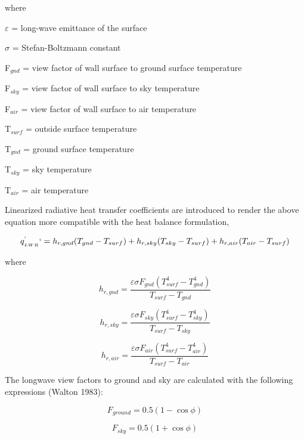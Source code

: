 where

$\varepsilon$ = long-wave emittance of the surface

$\sigma$ = Stefan-Boltzmann constant

F\(_{gnd}\) = view factor of wall surface to ground surface temperature

F\(_{sky}\) = view factor of wall surface to sky temperature

F\(_{air}\) = view factor of wall surface to air temperature

T\(_{surf}\) = outside surface temperature

T\(_{gnd}\) = ground surface temperature

T\(_{sky}\) = sky temperature

T\(_{air}\) = air temperature

Linearized radiative heat transfer coefficients are introduced to render the above equation more compatible with the heat balance formulation,

\begin{equation}
q_{_{LWR}}^`` = {h_{r,gnd}}({T_{gnd}} - {T_{surf}}) + {h_{r,sky}}({T_{sky}} - {T_{surf}}) + {h_{r,air}}({T_{air}} - {T_{surf}})
\end{equation}

where

\begin{equation}
{h_{r,gnd}} = \frac{{\varepsilon \sigma {F_{gnd}}(T_{surf}^4 - T_{gnd}^4)}}{{{T_{surf}} - {T_{gnd}}}}
\end{equation}

\begin{equation}
{h_{r,sky}} = \frac{{\varepsilon \sigma {F_{sky}}(T_{surf}^4 - T_{sky}^4)}}{{{T_{surf}} - {T_{sky}}}}
\end{equation}

\begin{equation}
{h_{r,air}} = \frac{{\varepsilon \sigma {F_{air}}(T_{surf}^4 - T_{air}^4)}}{{{T_{surf}} - {T_{air}}}}
\end{equation}

The longwave view factors to ground and sky are calculated with the following expressions (Walton 1983):

\begin{equation}
{F_{ground}} = 0.5(1 - \cos \phi )
\end{equation}

\begin{equation}
{F_{sky}} = 0.5(1 + \cos \phi )
\end{equation}

